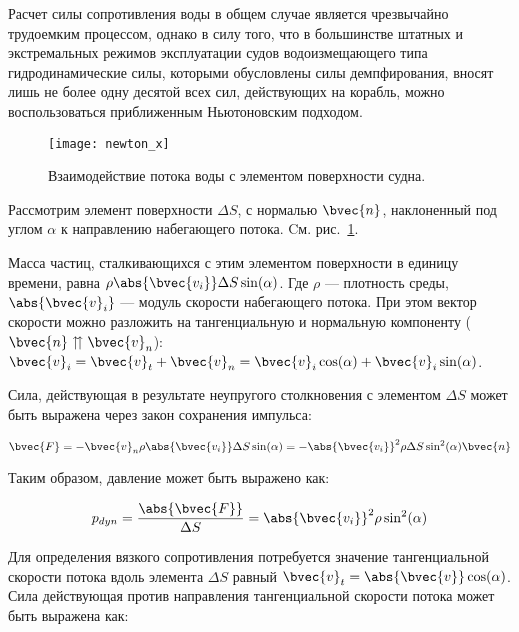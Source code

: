 
Расчет силы сопротивления воды в общем случае является чрезвычайно трудоемким процессом, однако в силу того, что в большинстве штатных и экстремальных режимов эксплуатации судов водоизмещающего типа гидродинамические силы, которыми обусловлены силы демпфирования, вносят лишь не более одну десятой всех сил, действующих на корабль, можно воспользоваться приближенным Ньютоновским подходом.

\begin{figure}[ht]
\begin{center}
\texttt{[image: newton\_x]}
\end{center}
\caption{Взаимодействие потока воды с элементом поверхности судна.}
\label{newton_x}
\end{figure}

Рассмотрим элемент поверхности $\Delta S$, с нормалью $\bvec{n}$, наклоненный под углом $\alpha$ к направлению набегающего потока. Cм. рис.~\ref{newton_x}.

Масса частиц, сталкивающихся с этим элементом поверхности в единицу времени, равна 
$\rho \abs{\bvec{v_i}} \Delta S \sin(\alpha)$. Где $\rho$ --- плотность среды, $\abs{\bvec{v}_i}$ --- модуль скорости набегающего потока. При этом вектор скорости можно разложить на тангенциальную и нормальную компоненту ($\bvec{n} \upuparrows \bvec{v}_n$): $\bvec{v}_{i}=\bvec{v}_t + \bvec{v}_n = \bvec{v}_{i} \cos(\alpha) + \bvec{v}_{i} \sin(\alpha)$.

Сила, действующая в результате неупругого столкновения с элементом $\Delta S$
может быть выражена через закон сохранения импульса:

\begin{equation}
	\bvec{F} = -\bvec{v}_n \rho \abs{\bvec{v_i}} \Delta S \sin(\alpha)
			 = -\abs{\bvec{v_i}}^2 \rho \Delta S \sin^2(\alpha) \bvec{n}
\end{equation}

Таким образом, давление может быть выражено как:

\begin{equation}
	p_{dyn} = \frac{\abs{\bvec{F}}}{\Delta S} = \abs{\bvec{v_i}}^2 \rho \sin^2(\alpha)
\end{equation}

Для определения вязкого сопротивления потребуется значение тангенциальной скорости потока вдоль элемента 
$\Delta S$ равный $\bvec{v}_t = \abs{\bvec{v}} \cos(\alpha)$. Сила действующая против направления тангенциальной скорости потока может быть выражена как:

